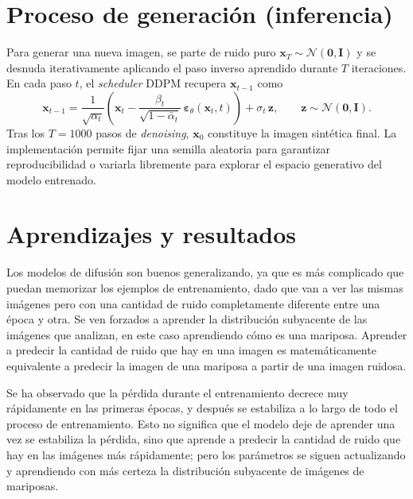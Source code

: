 \section{Proceso de generación (inferencia)}
\label{sec:mariposas-inferencia}

Para generar una nueva imagen, se parte de ruido puro
$\mathbf{x}_T \sim \mathcal{N}(\mathbf{0}, \mathbf{I})$ y se
desnuda iterativamente aplicando el paso inverso aprendido
durante $T$ iteraciones. En cada paso $t$, el \textit{scheduler}
DDPM recupera $\mathbf{x}_{t-1}$ como
\begin{equation}
    \mathbf{x}_{t-1}
    = \frac{1}{\sqrt{\alpha_t}}
      \!\left(\mathbf{x}_t
        - \frac{\beta_t}{\sqrt{1 - \bar{\alpha}_t}}\,
        \boldsymbol{\varepsilon}_\theta(\mathbf{x}_t, t)\right)
    + \sigma_t\,\mathbf{z},
    \qquad
    \mathbf{z} \sim \mathcal{N}(\mathbf{0}, \mathbf{I}).
\end{equation}
Tras los $T = 1000$ pasos de \textit{denoising}, $\mathbf{x}_0$
constituye la imagen sintética final. La implementación permite
fijar una semilla aleatoria para garantizar reproducibilidad o
variarla libremente para explorar el espacio generativo del modelo
entrenado.

\section{Aprendizajes y resultados}
\label{sec:mariposas-aprendizajes}

Los modelos de difusión son buenos generalizando, ya que es más
complicado que puedan memorizar los ejemplos de entrenamiento,
dado que van a ver las mismas imágenes pero con una cantidad de
ruido completamente diferente entre una época y otra. Se ven
forzados a aprender la distribución subyacente de las imágenes
que analizan, en este caso aprendiendo cómo es una mariposa.
Aprender a predecir la cantidad de ruido que hay en una imagen
es matemáticamente equivalente a predecir la imagen de una
mariposa a partir de una imagen ruidosa.

Se ha observado que la pérdida durante el entrenamiento decrece
muy rápidamente en las primeras épocas, y después se estabiliza
a lo largo de todo el proceso de entrenamiento. Esto no significa
que el modelo deje de aprender una vez se estabiliza la pérdida,
sino que aprende a predecir la cantidad de ruido que hay en las
imágenes más rápidamente; pero los parámetros se siguen
actualizando y aprendiendo con más certeza la distribución
subyacente de imágenes de mariposas.

